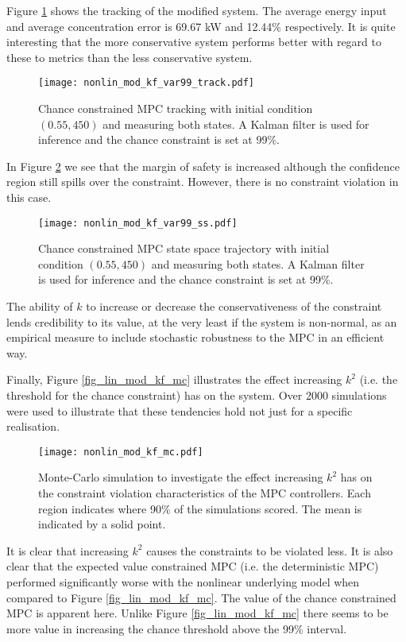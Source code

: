 Figure \ref{fig_nonlin_mod_kf_var99_track} shows the tracking of the modified system. The average energy input and average concentration error is 69.67 kW and 12.44\% respectively. It is quite interesting that the more conservative system performs better with regard to these to metrics than the less conservative system.
\begin{figure}[H] 
\centering
\texttt{[image: nonlin\_mod\_kf\_var99\_track.pdf]}
\caption{Chance constrained MPC tracking with initial condition $(0.55, 450)$ and measuring both states. A Kalman filter is used for inference and the chance constraint is set at 99\%.}
\label{fig_nonlin_mod_kf_var99_track}
\end{figure}
In Figure \ref{fig_nonlin_mod_kf_var99_ss} we see that the margin of safety is increased although the confidence region still spills over the constraint. However, there is no constraint violation in this case.
\begin{figure}[H] 
\centering
\texttt{[image: nonlin\_mod\_kf\_var99\_ss.pdf]}
\caption{Chance constrained MPC state space trajectory with initial condition $(0.55, 450)$ and measuring both states. A Kalman filter is used for inference and the chance constraint is set at 99\%.}
\label{fig_nonlin_mod_kf_var99_ss}
\end{figure}
The ability of $k$ to increase or decrease the conservativeness of the constraint lends credibility to its value, at the very least if the system is non-normal, as an empirical measure to include stochastic robustness to the MPC in an efficient way.

Finally, Figure \ref{fig_lin_mod_kf_mc} illustrates the effect increasing $k^2$ (i.e. the threshold for the chance constraint) has on the system. Over 2000 simulations were used to illustrate that these tendencies hold not just for a specific realisation. 
\begin{figure}[H] 
\centering
\texttt{[image: nonlin\_mod\_kf\_mc.pdf]}
\caption{Monte-Carlo simulation to investigate the effect increasing $k^2$ has on the constraint violation characteristics of the MPC controllers. Each region indicates where 90\% of the simulations scored. The mean is indicated by a solid point.}
\label{fig_nonlin_mod_kf_mc}
\end{figure}
It is clear that increasing $k^2$ causes the constraints to be violated less. It is also clear that the expected value constrained MPC (i.e. the deterministic MPC) performed significantly worse with the nonlinear underlying model when compared to Figure \ref{fig_lin_mod_kf_mc}. The value of the chance constrained MPC is apparent here. Unlike Figure \ref{fig_lin_mod_kf_mc} there seems to be more value in increasing the chance threshold above the 99\% interval.

